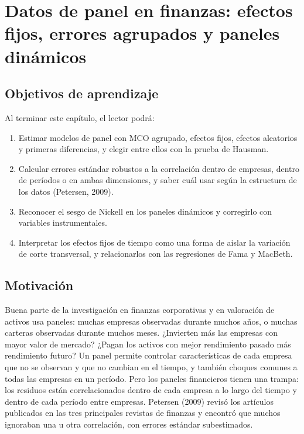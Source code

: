 \chapter[Datos de panel]{Datos de panel en finanzas: efectos fijos, errores agrupados y paneles dinámicos}\label{cap:panel}

\section*{Objetivos de aprendizaje}
Al terminar este capítulo, el lector podrá:
\begin{enumerate}[label=\arabic*.,leftmargin=*]
  \item Estimar modelos de panel con MCO agrupado, efectos fijos, efectos aleatorios y primeras diferencias, y elegir
        entre ellos con la prueba de Hausman.
  \item Calcular errores estándar robustos a la correlación dentro de empresas, dentro de períodos o en ambas
        dimensiones, y saber cuál usar según la estructura de los datos (Petersen, 2009).
  \item Reconocer el sesgo de Nickell en los paneles dinámicos y corregirlo con variables instrumentales.
  \item Interpretar los efectos fijos de tiempo como una forma de aislar la variación de corte transversal, y relacionarlos
        con las regresiones de Fama y MacBeth.
\end{enumerate}

\section*{Motivación}
Buena parte de la investigación en finanzas corporativas y en valoración de activos usa paneles: muchas empresas
observadas durante muchos años, o muchas carteras observadas durante muchos meses. ¿Invierten más las empresas con
mayor valor de mercado? ¿Pagan los activos con mejor rendimiento pasado más rendimiento futuro? Un panel permite
controlar características de cada empresa que no se observan y que no cambian en el tiempo, y también choques comunes
a todas las empresas en un período. Pero los paneles financieros tienen una trampa: los residuos están correlacionados
dentro de cada empresa a lo largo del tiempo y dentro de cada período entre empresas. Petersen (2009) revisó los
artículos publicados en las tres principales revistas de finanzas y encontró que muchos ignoraban una u otra
correlación, con errores estándar subestimados.

